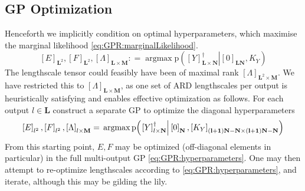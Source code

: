 \documentclass[preprint,12pt]{elsarticle}
\newcommand*{\M}[1]{\ensuremath{#1}\xspace}
\newcommand*{\x}{\times}
\newcommand*{\mi}[1]{\mathbf{#1}}
\newcommand*{\te}[2][]{\left\lbrack{#2}\right\rbrack_{#1}}
\newcommand*{\prob}[3]{\M{\mathrm{p}\!\left(\left.{#1}\right\vert{#2,#3}\right)}}
\newcommand*{\deq}{\M{\mathrel{\mathop:}=}}
\DeclareMathOperator*{\argmax}{argmax}
\begin{document}
    \subsection{GP Optimization} \label{sub:GPR:Optimization}
        Henceforth we implicitly condition on optimal hyperparameters, which maximise the marginal likelihood \cref{eq:GPR:marginalLikelihood}.
        \begin{equation} \label{eq:GPR:hyperparameters}
            \te[\mi{L}^{2}]{E},\te[\mi{L}^{2}]{F},\te[\mi{L}\x\mi{M}]{\Lambda} \deq \argmax \prob{\te[\mi{L\x N}]{Y}^{\dagger}}{\te[\mi{LN}]{0}}{K_Y}
        \end{equation}
        The lengthscale tensor could feasibly have been of maximal rank $\te[\mi{L}^{2}\x\mi{M}]{\Lambda}$. We have restricted this to $\te[\mi{L}\x\mi{M}]{\Lambda}$, as one set of ARD lengthscales per output is heuristically satisfying and enables effective optimization as follows.
        For each output $l \in \mi{L}$ construct a separate GP to optimize the diagonal hyperparameters
        \begin{equation*}
            \te[l^{2}]{E},\te[l^{2}]{F},\te[l\x\mi{M}]{\Lambda} = \\
            \argmax \prob{\te[l\x \mi{N}]{Y}^{\dagger}}{\te[\mi{N}]{0}}{\te[\mi{(l+1)N-N}\x\mi{(l+1)N-N}]{K_Y}}
        \end{equation*}
        From this starting point, $E,F$ may be optimized (off-diagonal elements in particular) in the full multi-output GP \cref{eq:GPR:hyperparameters}. One may then attempt to re-optimize lengthscales according to \cref{eq:GPR:hyperparameters}, and iterate, although this may be gilding the lily.
\end{document}
